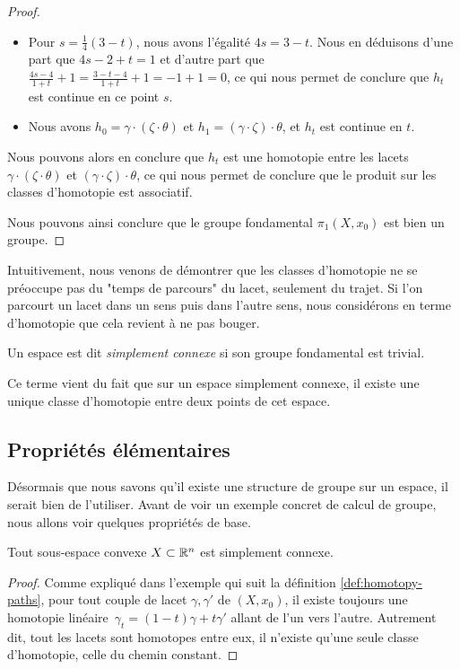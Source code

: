 \begin{proof}
\begin{enumerate}
\begin{itemize}
        \item Pour $s=\frac{1}{4}(3-t)$, nous avons l'égalité $4s=3-t$. Nous en déduisons d'une part que $4s-2+t=1$ et d'autre part que~${\frac{4s-4}{1+t}+1=\frac{3-t-4}{1+t}+1=-1+1=0}$, ce qui nous permet de conclure que $h_t$ est continue en ce point $s$.
        \item Nous avons $h_0=\gamma\cdot(\zeta\cdot\theta)$ et $h_1=(\gamma\cdot\zeta)\cdot\theta$, et $h_t$ est continue en $t$.
    \end{itemize}Nous pouvons alors en conclure que $h_t$ est une homotopie entre les lacets~$\gamma\cdot(\zeta\cdot\theta)$ et $(\gamma\cdot\zeta)\cdot\theta$, ce qui nous permet de conclure que le produit sur les classes d'homotopie est associatif.
\end{enumerate}Nous pouvons ainsi conclure que le groupe fondamental $\pi_1(X,x_0)$ est bien un groupe.
\end{proof}

Intuitivement, nous venons de démontrer que les classes d'homotopie ne se préoccupe pas du "temps de parcours" du lacet, seulement du trajet. Si l'on parcourt un lacet dans un sens puis dans l'autre sens, nous considérons en terme d'homotopie que cela revient à ne pas bouger.

\begin{definition}
Un espace est dit \emph{simplement connexe} si son groupe fondamental est trivial.
\end{definition}
Ce terme vient du fait que sur un espace simplement connexe, il existe une unique classe d'homotopie entre deux points de cet espace.

\subsection{Propriétés élémentaires}

Désormais que nous savons qu'il existe une structure de groupe sur un espace, il serait bien de l'utiliser. Avant de voir un exemple concret de calcul de groupe, nous allons voir quelques propriétés de base.

\begin{proposition}
Tout sous-espace convexe $X\subset\mathbb{R}^n$ est simplement connexe.
\end{proposition}
\begin{proof}
Comme expliqué dans l'exemple qui suit la définition \ref{def:homotopy-paths}, pour tout couple de lacet $\gamma,\gamma'$ de $(X,x_0)$, il existe toujours une homotopie linéaire~$\gamma_t=(1-t)\gamma+t\gamma'$ allant de l'un vers l'autre. Autrement dit, tout les lacets sont homotopes entre eux, il n'existe qu'une seule classe d'homotopie, celle du chemin constant.
\end{proof}

